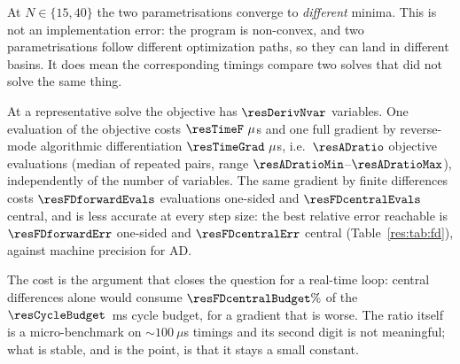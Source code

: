 At $N\in\{15, 40\}$ the two parametrisations converge to \emph{different} minima. This is not an implementation error: the program is non-convex, and two parametrisations follow different optimization paths, so they can land in different basins. It does mean the corresponding timings compare two solves that did not solve the same thing.

\begin{table}[htbp]
  \centering
  \small
  \caption{Multiple (M) against single (S) shooting on the same instance. Dimensions, densities and iteration counts are exact; each timing is the fastest of three cold solves, with no warm start.}
  \label{res:tab:shoot}
\end{table}

\label{res:ad}


At a representative solve the objective has $\resDerivNvar$ variables. One evaluation of the objective costs $\resTimeF~\mu$s and one full gradient by reverse-mode algorithmic differentiation $\resTimeGrad~\mu$s, i.e.\ $\resADratio$ objective evaluations (median of repeated pairs, range $\resADratioMin$--$\resADratioMax$), independently of the number of variables. The same gradient by finite differences costs $\resFDforwardEvals$ evaluations one-sided and $\resFDcentralEvals$ central, and is less accurate at every step size: the best relative error reachable is $\resFDforwardErr$ one-sided and $\resFDcentralErr$ central (Table~\ref{res:tab:fd}), against machine precision for AD.

The cost is the argument that closes the question for a real-time loop: central differences alone would consume $\resFDcentralBudget\%$ of the $\resCycleBudget$~ms cycle budget, for a gradient that is worse. The ratio itself is a micro-benchmark on $\sim100~\mu$s timings and its second digit is not meaningful; what is stable, and is the point, is that it stays a small constant.

\begin{table}[htbp]
  \centering
  \small
  \caption{Accuracy of the finite-difference gradient against the step size, measured against the AD gradient. The optimum sits at $h=1.49\times 10^{-8}$ one-sided (theory: $\sqrt{\varepsilon}=1.49\times 10^{-8}$) and $h=6.06\times 10^{-6}$ central (theory: $\varepsilon^{1/3}=6.06\times 10^{-6}$).}
  \label{res:tab:fd}
\end{table}

